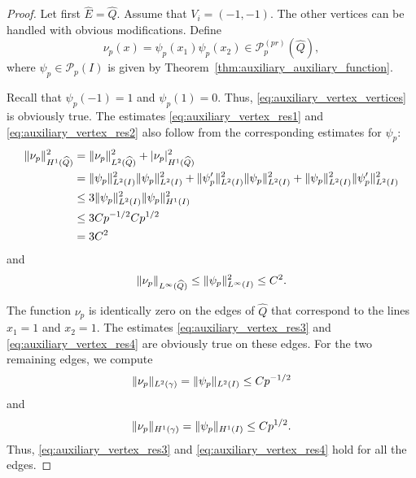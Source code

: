 \documentclass[english, 12pt, a4paper, sci, utf8, a-2b, online]{aaltothesis}
\theoremstyle{definition}
\theoremstyle{plain}
\DeclarePairedDelimiter\abs{\lvert}{\rvert}
\DeclarePairedDelimiter\norm{\lVert}{\rVert}
\numberwithin{equation}{section}
\begin{document}
\begin{proof}
    Let first $\widehat{E} = \widehat{Q}$.
    Assume that $V_i = (-1,-1)$. The other vertices can be handled
    with obvious modifications. Define
    \begin{equation*}
        \nu_p(x) = \psi_p(x_1) \psi_p(x_2) \in \mathcal{P}_p^{(pr)}(\widehat{Q}),
    \end{equation*}
    where $\psi_p \in \mathcal{P}_p(I)$ is given by
    Theorem~\ref{thm:auxiliary_auxiliary_function}.

    Recall that $\psi_p(-1)=1$ and $\psi_p(1)=0$.
    Thus, \eqref{eq:auxiliary_vertex_vertices} is obviously true.
    The estimates \eqref{eq:auxiliary_vertex_res1}
    and \eqref{eq:auxiliary_vertex_res2} also follow from the corresponding
    estimates for $\psi_p$:
    \begin{align*}
        \norm{\nu_p}_{H^1(\widehat{Q})}^2
        &= \norm{\nu_p}_{L^2(\widehat{Q})}^2 + \abs{\nu_p}_{H^1(\widehat{Q})}^2 \\
        &= \norm{\psi_p}_{L^2(I)}^2 \norm{\psi_p}_{L^2(I)}^2
            + \norm{\psi_p'}_{L^2(I)}^2 \norm{\psi_p}_{L^2(I)}^2
            + \norm{\psi_p}_{L^2(I)}^2 \norm{\psi_p'}_{L^2(I)}^2 \\
        &\leq 3 \norm{\psi_p}_{L^2(I)}^2 \norm{\psi_p}_{H^1(I)}^2 \\
        &\leq 3 C p^{-1/2} C p^{1/2} \\
        &= 3 C^2
    \end{align*}
    and
    \begin{equation*}
        \norm{\nu_p}_{L^{\infty}(\widehat{Q})}
        \leq \norm{\psi_p}_{L^{\infty}(I)}^2
        \leq C^2.
    \end{equation*}

    The function $\nu_p$ is identically zero on the edges of $\widehat{Q}$
    that correspond to the lines $x_1 = 1$ and $x_2 = 1$.
    The estimates \eqref{eq:auxiliary_vertex_res3}
    and \eqref{eq:auxiliary_vertex_res4} are obviously true on these
    edges. For the two remaining edges, we compute
    \begin{equation*}
        \norm{\nu_p}_{L^2(\gamma)}
        = \norm{\psi_p}_{L^2(I)}
        \leq C p^{-1/2}
    \end{equation*}
    and
    \begin{equation*}
        \norm{\nu_p}_{H^1(\gamma)}
        = \norm{\psi_p}_{H^1(I)}
        \leq C p^{1/2}.
    \end{equation*}
    Thus, \eqref{eq:auxiliary_vertex_res3}
    and \eqref{eq:auxiliary_vertex_res4} hold for all the edges.


\end{proof}
\end{document}
